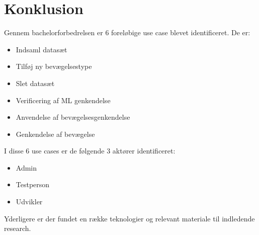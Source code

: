 \thispagestyle{fancy}
\chapter{Konklusion}
\label{chp:konklusion}
Gennem bachelorforbedrelsen er 6 foreløbige use case blevet identificeret. De er:
\begin{itemize}
	\item Indsaml datasæt
	\item Tilføj ny bevægelsestype
	\item Slet datasæt
	\item Verificering af ML genkendelse
	\item Anvendelse af bevægelsesgenkendelse
	\item Genkendelse af bevægelse
\end{itemize}

I disse 6 use cases er de følgende 3 aktører identificeret:
\begin{itemize}
	\item Admin
	\item Testperson
	\item Udvikler
\end{itemize}

Yderligere er der fundet en række teknologier og relevant materiale til indledende research.